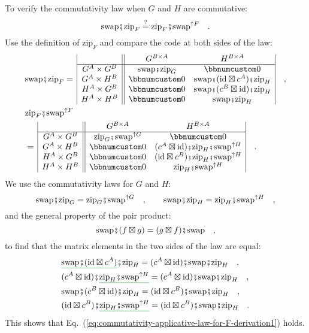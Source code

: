 To verify the commutativity law when $G$ and $H$ are commutative:
\begin{equation}
\text{swap}\bef\text{zip}_{F}\overset{?}{=}\text{zip}_{F}\bef\text{swap}^{\uparrow F}\quad.\label{eq:commutativity-applicative-law-for-F-derivation1}
\end{equation}
Use the definition of $\text{zip}_{F}$ and compare the code at both
sides of the law:
\begin{align*}
 & \text{swap}\bef\text{zip}_{F}=\,\begin{array}{|c||cc|}
 & G^{B\times A} & H^{B\times A}\\
\hline G^{A}\times G^{B} & \text{swap}\bef\text{zip}_{G} & \bbnum 0\\
G^{A}\times H^{B} & \bbnum 0 & \text{swap}\bef(\text{id}\boxtimes c^{A})\bef\text{zip}_{H}\\
H^{A}\times G^{B} & \bbnum 0 & \text{swap}\bef(c^{B}\boxtimes\text{id})\bef\text{zip}_{H}\\
H^{A}\times H^{B} & \bbnum 0 & \text{swap}\bef\text{zip}_{H}
\end{array}\quad,\\
 & \text{zip}_{F}\bef\text{swap}^{\uparrow F}\\
 & =\,\begin{array}{|c||cc|}
 & G^{B\times A} & H^{B\times A}\\
\hline G^{A}\times G^{B} & \text{zip}_{G}\bef\text{swap}^{\uparrow G} & \bbnum 0\\
G^{A}\times H^{B} & \bbnum 0 & (c^{A}\boxtimes\text{id})\bef\text{zip}_{H}\bef\text{swap}^{\uparrow H}\\
H^{A}\times G^{B} & \bbnum 0 & (\text{id}\boxtimes c^{B})\bef\text{zip}_{H}\bef\text{swap}^{\uparrow H}\\
H^{A}\times H^{B} & \bbnum 0 & \text{zip}_{H}\bef\text{swap}^{\uparrow H}
\end{array}\quad.
\end{align*}
We use the commutativity laws for $G$ and $H$:
\[
\text{swap}\bef\text{zip}_{G}=\text{zip}_{G}\bef\text{swap}^{\uparrow G}\quad,\quad\quad\text{swap}\bef\text{zip}_{H}=\text{zip}_{H}\bef\text{swap}^{\uparrow H}\quad,
\]
and the general property of the pair product:
\[
\text{swap}\bef(f\boxtimes g)=(g\boxtimes f)\bef\text{swap}\quad,
\]
to find that the matrix elements in the two sides of the law are equal:
\begin{align*}
 & \gunderline{\text{swap}\bef(\text{id}\boxtimes c^{A})}\bef\text{zip}_{H}=(c^{A}\boxtimes\text{id})\bef\text{swap}\bef\text{zip}_{H}\quad,\\
 & (c^{A}\boxtimes\text{id})\bef\gunderline{\text{zip}_{H}\bef\text{swap}^{\uparrow H}}=(c^{A}\boxtimes\text{id})\bef\text{swap}\bef\text{zip}_{H}\quad,\\
 & \text{swap}\bef(c^{B}\boxtimes\text{id})\bef\text{zip}_{H}=(\text{id}\boxtimes c^{B})\bef\text{swap}\bef\text{zip}_{H}\quad,\\
 & (\text{id}\boxtimes c^{B})\bef\gunderline{\text{zip}_{H}\bef\text{swap}^{\uparrow H}}=(\text{id}\boxtimes c^{B})\bef\text{swap}\bef\text{zip}_{H}\quad.
\end{align*}
This shows that Eq.~(\ref{eq:commutativity-applicative-law-for-F-derivation1})
holds.

